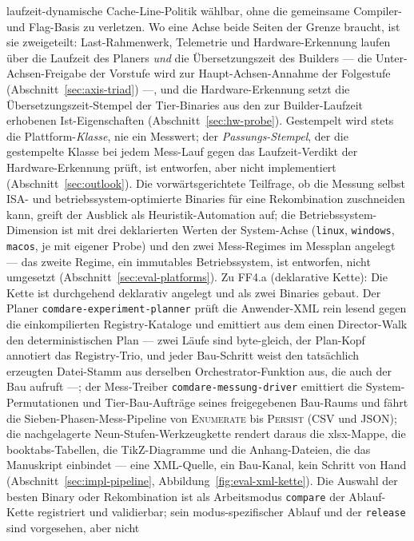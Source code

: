 \begin{nurlang}
laufzeit-dynamische Cache-Line-Politik wählbar, ohne die gemeinsame Compiler- und Flag-Basis zu
verletzen. Wo eine Achse beide Seiten der Grenze braucht, ist sie zweigeteilt: Last-Rahmenwerk,
Telemetrie und Hardware-Erkennung laufen über die Laufzeit des Planers \emph{und} die Übersetzungszeit
des Builders --- die Unter-Achsen-Freigabe der Vorstufe wird zur Haupt-Achsen-Annahme der Folgestufe
(Abschnitt~\ref{sec:axis-triad}) ---, und die Hardware-Erkennung setzt die Übersetzungszeit-Stempel der
Tier-Binaries aus den zur Builder-Laufzeit erhobenen Ist-Eigenschaften (Abschnitt~\ref{sec:hw-probe}).
Gestempelt wird stets die Plattform-\emph{Klasse}, nie ein Messwert; der \emph{Passungs-Stempel}, der
die gestempelte Klasse bei jedem Mess-Lauf gegen das Laufzeit-Verdikt der Hardware-Erkennung prüft, ist
entworfen, aber nicht implementiert (Abschnitt~\ref{sec:outlook}). Die vorwärtsgerichtete Teilfrage, ob die Messung
selbst ISA- und betriebssystem-optimierte Binaries für eine Rekombination zuschneiden kann, greift der
Ausblick als Heuristik-Automation auf; die Betriebssystem-Dimension ist mit drei deklarierten Werten
der System-Achse (\texttt{linux}, \texttt{windows}, \texttt{macos}, je mit eigener Probe) und den zwei
Mess-Regimes im Messplan angelegt --- das zweite Regime, ein immutables Betriebssystem, ist entworfen,
nicht umgesetzt (Abschnitt~\ref{sec:eval-platforms}). Zu FF4.a (deklarative Kette): Die Kette ist
durchgehend deklarativ angelegt und als zwei Binaries gebaut. Der Planer
\texttt{comdare-experiment-planner} prüft die Anwender-XML rein lesend gegen die einkompilierten
Registry-Kataloge und emittiert aus dem einen Director-Walk den deterministischen Plan --- zwei Läufe
sind byte-gleich, der Plan-Kopf annotiert das Registry-Trio, und jeder Bau-Schritt weist den tatsächlich
erzeugten Datei-Stamm aus derselben Orchestrator-Funktion aus, die auch der Bau aufruft ---; der
Mess-Treiber \texttt{comdare-messung-driver} emittiert die System-Permutationen und
Tier-Bau-Aufträge seines freigegebenen Bau-Raums und fährt die Sieben-Phasen-Mess-Pipeline von
\textsc{Enumerate} bis \textsc{Persist} (CSV und JSON); die nachgelagerte Neun-Stufen-Werkzeugkette
rendert daraus die xlsx-Mappe, die booktabs-Tabellen, die TikZ-Diagramme und die Anhang-Dateien, die
das Manuskript einbindet --- eine XML-Quelle, ein Bau-Kanal, kein Schritt von Hand
(Abschnitt~\ref{sec:impl-pipeline}, Abbildung~\ref{fig:eval-xml-kette}). Die Auswahl der besten
Binary oder Rekombination ist als Arbeitsmodus \texttt{compare} der Ablauf-Kette registriert und
validierbar; sein modus-spezifischer Ablauf und der \texttt{release} sind vorgesehen, aber nicht

\end{nurlang}
